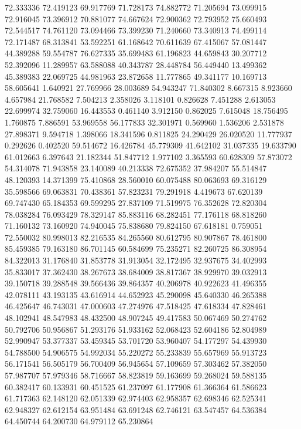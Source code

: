 72.333336
72.419123
69.917769
71.728173
74.882772
71.205694
73.099915
72.916045
73.396912
70.881077
74.667624
72.900362
72.793952
75.660493
72.544517
74.761120
73.094466
73.399230
71.240660
73.340913
74.499114
72.171487
68.313841
53.592251
61.168642
70.611639
67.415067
57.081447
44.389288
59.554787
76.627335
35.699483
61.196823
44.659843
30.207712
52.392096
11.289957
63.588088
40.343787
28.448784
56.449440
13.499362
45.389383
22.069725
44.981963
23.872658
11.777865
49.341177
10.169713
58.605641
1.640921
27.769966
28.003689
54.943247
71.840302
8.667315
8.923660
4.657984
21.768582
7.504213
2.358026
3.118101
0.826628
7.451288
2.613053
22.699974
32.759060
16.443553
0.461140
3.912150
0.862025
7.615048
18.756495
1.760875
7.886591
53.969558
56.177833
32.301971
0.569960
1.536206
2.531878
27.898371
9.594718
1.398066
18.341596
0.811825
24.290429
26.020520
11.777937
0.292626
0.402520
59.514672
16.426784
45.779309
41.642102
31.037335
19.633790
61.012663
6.397643
21.182344
51.847712
1.977102
3.365593
60.628309
57.873072
54.314078
71.943858
23.140089
40.213338
72.675352
37.984207
55.514847
48.120393
14.371399
75.410868
28.560010
60.075488
80.063693
69.316129
35.598566
69.063831
70.438361
57.823231
79.291918
4.419673
67.620139
69.747430
65.184353
69.599295
27.837109
71.519975
76.352628
72.820304
78.038284
76.093429
78.329147
85.883116
68.282451
77.176118
68.818260
71.160132
73.160920
74.940045
75.838680
79.824150
67.618181
0.759051
72.550032
80.998013
82.216535
84.265560
80.612795
80.907867
78.461800
85.459385
79.163180
86.701145
60.584699
75.235271
82.260725
86.308954
84.322013
31.176840
31.853778
31.913054
32.172495
32.937675
34.402993
35.833017
37.362430
38.267673
38.684009
38.817367
38.929970
39.032913
39.150718
39.288548
39.566436
39.864357
40.206978
40.922623
41.496355
42.078111
43.193135
43.616914
44.652923
45.290098
45.640330
46.265388
46.425647
46.743031
47.000603
47.274976
47.518425
47.618334
47.828461
48.102941
48.547983
48.432500
48.907245
49.417583
50.067469
50.274762
50.792706
50.956867
51.293176
51.933162
52.068423
52.604186
52.804989
52.990947
53.377337
53.459345
53.701720
53.960407
54.177297
54.439930
54.788500
54.906575
54.992034
55.220272
55.233839
55.657969
55.913723
56.171541
56.505179
56.700409
56.945654
57.109659
57.303462
57.382050
57.987707
57.979346
58.716667
58.823819
59.163699
59.268024
59.588135
60.382417
60.133931
60.451525
61.237097
61.177908
61.366364
61.586623
61.717363
62.148120
62.051339
62.974403
62.958357
62.698346
62.525341
62.948327
62.612154
63.951484
63.691248
62.746121
63.547457
64.536384
64.450744
64.200730
64.979112
65.230864
